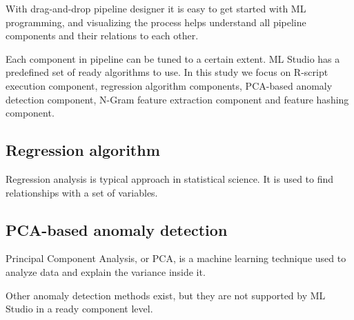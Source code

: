 With drag-and-drop pipeline designer
it is easy to get started with ML programming,
and visualizing the process helps understand all pipeline components
and their relations to each other.

Each component in pipeline can be tuned
to a certain extent.
ML Studio has a predefined set of ready algorithms to use.
In this study we focus on  %
R-script execution component,
regression algorithm components,
PCA-based anomaly detection component,
N-Gram feature extraction component and
feature hashing component.



\subsection{Regression algorithm}\label{subsec:bg-regression-ml}
Regression analysis is typical approach in statistical science.
It is used to find relationships with a set of variables.


\subsection{PCA-based anomaly detection}\label{subsec:bg-pca-ada}




Principal Component Analysis, or PCA,
is a machine learning technique
used to analyze data and explain the variance inside it.

Other anomaly detection methods exist, but they are not supported by ML Studio
in a ready component level. %

